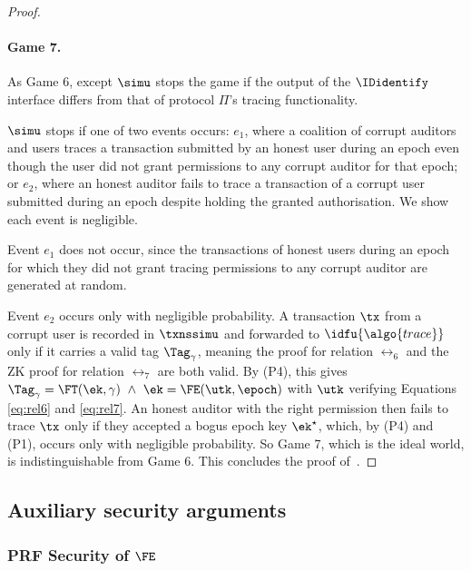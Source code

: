 \begin{proof}
\begin{description}
  \end{description}

  \paragraph{Game 7.} As Game 6, except $\simu$ stops the game if the output of
  the $\IDidentify$ interface differs from that of protocol $\Pi$'s tracing
  functionality.

  $\simu$ stops if one of two events occurs: $e_1$, where a coalition of
  corrupt auditors and users traces a transaction submitted by an honest user
  during an epoch even though the user did not grant permissions to any corrupt
  auditor for that epoch; or $e_2$, where an honest auditor fails to trace a
  transaction of a corrupt user submitted during an epoch despite holding the
  granted authorisation. We show each event is negligible.

  Event $e_1$ does not occur, since the transactions of honest users during an
  epoch for which they did not grant tracing permissions to any corrupt auditor
  are generated at random.

  Event $e_2$ occurs only with negligible probability. A transaction $\tx$ from
  a corrupt user is recorded in $\txnssimu$ and forwarded to
  $\idfu{\algo{trace}}$ only if it carries a valid tag $\Tag_{\gamma}$, meaning
  the proof for relation $\rel_6$ and the ZK proof for relation $\rel_7$ are
  both valid. By (P4), this gives $\Tag_{\gamma} = \FT(\ek, \gamma) \ \wedge \
  \ek = \FE(\utk, \epoch)$ with $\utk$ verifying Equations \ref{eq:rel6} and
  \ref{eq:rel7}. An honest auditor with the right permission then fails to
  trace $\tx$ only if they accepted a bogus epoch key $\ek^\star$, which, by
  (P4) and (P1), occurs only with negligible probability. So Game 7, which is
  the ideal world, is indistinguishable from Game 6. This concludes the proof
  of~\Cref{thm:txid-bb}.

\end{proof}

\subsection{Auxiliary security arguments}

\subsubsection*{PRF Security of $\FE$}\label{sec:txid-fe-prf-proof}


